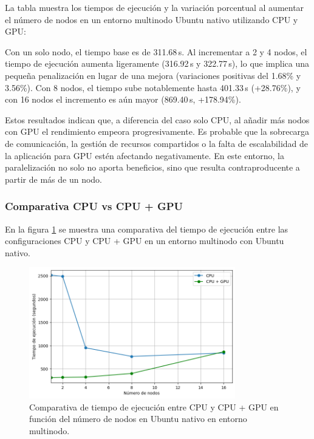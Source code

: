 La tabla muestra los tiempos de ejecución y la variación porcentual al aumentar el número de nodos en un entorno multinodo Ubuntu nativo utilizando CPU y GPU:

Con un solo nodo, el tiempo base es de 311.68\,s. Al incrementar a 2 y 4 nodos, el tiempo de ejecución aumenta ligeramente (316.92\,s y 322.77\,s), lo que implica una pequeña penalización en lugar de una mejora (variaciones positivas del 1.68\% y 3.56\%). Con 8 nodos, el tiempo sube notablemente hasta 401.33\,s (+28.76\%), y con 16 nodos el incremento es aún mayor (869.40\,s, +178.94\%).

Estos resultados indican que, a diferencia del caso solo CPU, al añadir más nodos con GPU el rendimiento empeora progresivamente. Es probable que la sobrecarga de comunicación, la gestión de recursos compartidos o la falta de escalabilidad de la aplicación para GPU estén afectando negativamente. En este entorno, la paralelización no solo no aporta beneficios, sino que resulta contraproducente a partir de más de un nodo.

\subsubsection{Comparativa CPU vs CPU + GPU}

En la figura \ref{fig:multi-node_ubuntu_cpu_vs_gpu_native_time} se muestra una comparativa del tiempo de ejecución entre las configuraciones CPU y CPU + GPU en un entorno multinodo con Ubuntu nativo.

\begin{figure}[H]
    \centering
    \includegraphics[width=0.8\textwidth]{imagenes/cap5/multi-node_ubuntu_cpu_vs_gpu_native_time.png}
    \caption{Comparativa de tiempo de ejecución entre CPU y CPU + GPU en función del número de nodos en Ubuntu nativo en entorno multinodo.}
    \label{fig:multi-node_ubuntu_cpu_vs_gpu_native_time}
\end{figure}

